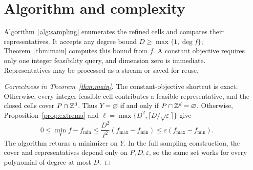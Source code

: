 \documentclass[final,5p,times,twocolumn]{elsarticle}
\theoremstyle{definition}\newtheorem{definition}{Definition}[section]
\theoremstyle{remark}\newtheorem{remark}[theorem]{Remark}
\newcommand{\eps}{\varepsilon}
\begin{document}
\section{Algorithm and complexity}\label{sec:algorithm}

Algorithm~\ref{alg:sampling} enumerates the refined cells and compares their representatives. It accepts any degree bound $D\ge\max\{1,\deg f\}$; Theorem~\ref{thm:main} computes this bound from $f$. A constant objective requires only one integer feasibility query, and dimension zero is immediate. Representatives may be processed as a stream or saved for reuse.

\begin{algorithm}[tbp]
\centering
{}
\caption{The full sampling construction depends only on $P,D,\eps$. The constant-objective shortcut returns one feasible point without constructing the reusable representative set.}
\label{alg:sampling}
\end{algorithm}

\begin{proof}[Correctness in Theorem~\ref{thm:main}]
The constant-objective shortcut is exact. Otherwise, every integer-feasible cell contributes a feasible representative, and the closed cells cover $P\cap\mathbb Z^d$. Thus $Y=\varnothing$ if and only if $P\cap\mathbb Z^d=\varnothing$. Otherwise, Proposition~\ref{prop:extrema} and $\ell=\max\{D^2,\lceil D/\sqrt\eps\rceil\}$ give
\[
 0\le\min_Y f-f_{\min}\le \frac{D^2}{\ell^2}(f_{\max}-f_{\min})\le\eps (f_{\max}-f_{\min}).
\]
The algorithm returns a minimizer on $Y$. In the full sampling construction, the cover and representatives depend only on $P,D,\eps$, so the same set works for every polynomial of degree at most $D$.
\end{proof}
\end{document}
